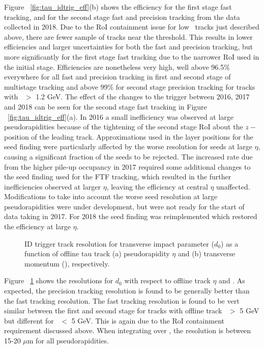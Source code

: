 		Figure ~\ref{fig:tau_idtrig_eff}(b) shows the efficiency for the first stage fast tracking, and for the second stage fast and precision tracking from the data collected in 2018. Due to the \ac{RoI} containment issue for low \pt\ tracks  just described above, there are fewer sample of tracks near the threshold.
		This results in lower efficiencies and larger uncertainties for both the fast and precision tracking, but more significantly for the first stage fast tracking due to the narrower \ac{RoI} used in the initial stage. 
		Efficiencies are nonetheless very high, well above 96.5\% everywhere for all fast and precision tracking in first and second stage of multistage tracking and above 99\% for second stage precision tracking for tracks with \pt\ $>$ 1.2 GeV. 
		The effect of the changes to the trigger between 2016, 2017 and 2018 can be seen for the second stage fast tracking in Figure ~\ref{fig:tau_idtrig_eff}(a). In 2016 a small inefficiency was observed at large pseudorapidities because of the tightening of the second stage \ac{RoI} about the $z-$position of the leading track. 
		Approximations used in the layer positions for the seed finding were particularly affected by the worse resolution for seeds at large $\eta$, causing a significant fraction of the seeds to be rejected. The increased rate due from the higher pile-up occupancy in 2017 required some additional changes to the seed finding used for the \ac{FTF} tracking, which resulted in the further inefficiencies observed at larger $\eta$, leaving the efficiency at central $\eta$ unaffected.
		Modifications to take into account the worse seed resolution at large pseudorapidities were under development, but were not ready for the start of data taking in 2017. For 2018 the seed finding was reimplemented which restored the efficiency at large $\eta$.
		
		\begin{figure}[!hbt]
	\begin{center}
		\hspace{0.03\textwidth}
			\hspace{0.03\textwidth}
	\end{center}	
	\caption{\ac{ID} trigger track resolution for transverse impact parameter ($d_0$) as a function of offline tau track (a) pseudorapidity $\eta$ and (b) transverse momentum (\pt), respectively.}
	\label{fig:tau_idtrig_res}
	\end{figure}	
	Figure ~\ref{fig:tau_idtrig_res} shows the resolutions for $d_0$ with respect to offline track $\eta$ and \pt. 
	As expected, the precision tracking resolution is found to be generally better than the fast tracking resolution. The fast tracking resolution is found to be vert similar between the first and second stage for tracks with offline track \pt\ $>$ 5 GeV but different for \pt\ $<$ 5 GeV. This is again due to the \ac{RoI} containment requirement discussed above. When integrating over \pt, the resolution is between 15-20 $\mu$m for all pseudorapidities. 

